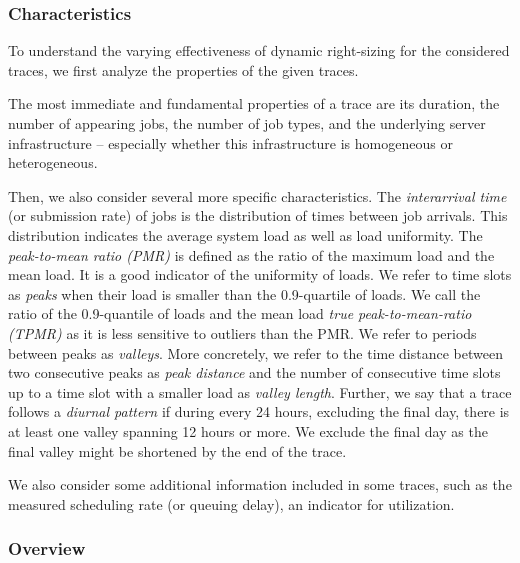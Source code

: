\subsubsection{Characteristics}

To understand the varying effectiveness of dynamic right-sizing for the considered traces, we first analyze the properties of the given traces.

The most immediate and fundamental properties of a trace are its duration, the number of appearing jobs, the number of job types, and the underlying server infrastructure -- especially whether this infrastructure is homogeneous or heterogeneous.

Then, we also consider several more specific characteristics. The \emph{interarrival time} (or submission rate) of jobs is the distribution of times between job arrivals. This distribution indicates the average system load as well as load uniformity. The \emph{peak-to-mean ratio (PMR)} is defined as the ratio of the maximum load and the mean load. It is a good indicator of the uniformity of loads. We refer to time slots as \emph{peaks} when their load is smaller than the 0.9-quartile of loads. We call the ratio of the 0.9-quantile of loads and the mean load \emph{true peak-to-mean-ratio (TPMR)} as it is less sensitive to outliers than the PMR. We refer to periods between peaks as \emph{valleys}. More concretely, we refer to the time distance between two consecutive peaks as \emph{peak distance} and the number of consecutive time slots up to a time slot with a smaller load as \emph{valley length}. Further, we say that a trace follows a \emph{diurnal pattern} if during every 24 hours, excluding the final day, there is at least one valley spanning 12 hours or more. We exclude the final day as the final valley might be shortened by the end of the trace.

We also consider some additional information included in some traces, such as the measured scheduling rate (or queuing delay), an indicator for utilization.

\subsubsection{Overview}

